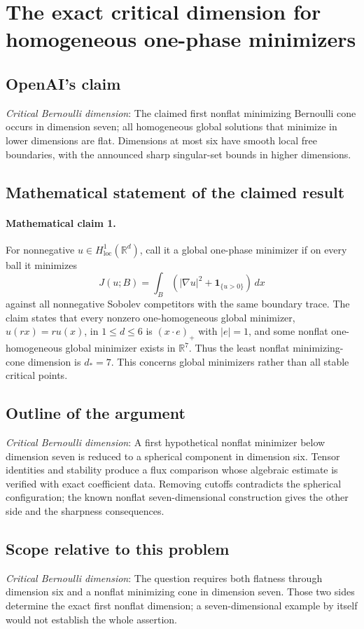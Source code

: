 \documentclass[11pt]{article}
\begin{document}
\section*{The exact critical dimension for homogeneous one-phase minimizers}

\subsection{OpenAI's claim}
\textit{Critical Bernoulli dimension}: The claimed first nonflat minimizing Bernoulli cone occurs in dimension seven; all homogeneous global solutions that minimize in lower dimensions are flat. Dimensions at most six have smooth local free boundaries, with the announced sharp singular-set bounds in higher dimensions.

\subsection{Mathematical statement of the claimed result}
\paragraph{Mathematical claim 1.} For nonnegative $u\in H^1_{\mathrm{loc}}(\mathbb R^d)$, call it a global one-phase minimizer if on every ball it minimizes \[J(u;B)=\int_B(|\nabla u|^2+\mathbf1_{\{u>0\}})\,dx\] against all nonnegative Sobolev competitors with the same boundary trace. The claim states that every nonzero one-homogeneous global minimizer, $u(rx)=ru(x)$, in $1\le d\le6$ is $(x\cdot e)_+$ with $|e|=1$, and some nonflat one-homogeneous global minimizer exists in $\mathbb R^7$. Thus the least nonflat minimizing-cone dimension is $d_*=7$. This concerns global minimizers rather than all stable critical points.

\subsection{Outline of the argument}
\textit{Critical Bernoulli dimension}: A first hypothetical nonflat minimizer below dimension seven is reduced to a spherical component in dimension six. Tensor identities and stability produce a flux comparison whose algebraic estimate is verified with exact coefficient data. Removing cutoffs contradicts the spherical configuration; the known nonflat seven-dimensional construction gives the other side and the sharpness consequences.

\subsection{Scope relative to this problem}
\textit{Critical Bernoulli dimension}: The question requires both flatness through dimension six and a nonflat minimizing cone in dimension seven. Those two sides determine the exact first nonflat dimension; a seven-dimensional example by itself would not establish the whole assertion.
\end{document}
